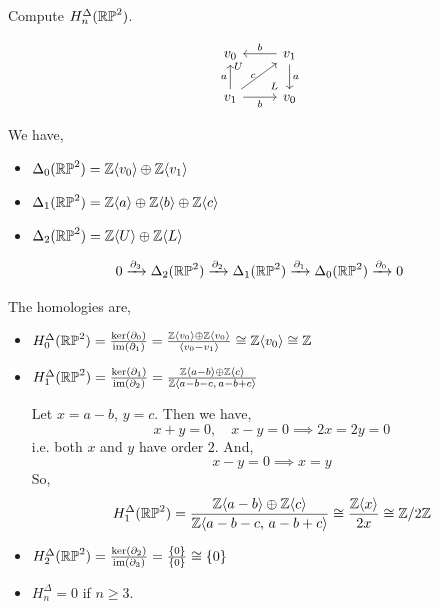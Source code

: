 \documentclass[12pt]{amsart}
\begin{document}
\begin{example}
    Compute $H^\Delta_n (\mathbb{RP}^2)$. 

    \[
    \begin{tikzcd}
    v_0   & v_1  \arrow[d,"a"] \arrow[l,"b", swap]\\
    v_1 \arrow[u,"a"] \arrow[r,swap,"b"] \arrow[ur,"c"{yshift = -.05in}] \arrow[ur, phantom, "\scriptstyle U"{yshift=0.1in, xshift=-.2in}] & v_0  \arrow[ul, phantom, "\scriptstyle L", very near start]
    \end{tikzcd}
    \]
    

    We have, 
    \begin{itemize}
        \item $\Delta_0(\mathbb{RP}^2) = \mathbb Z \langle v_0 \rangle \oplus \mathbb Z \langle v_1 \rangle$ 
        \item $\Delta_1(\mathbb{RP}^2) = \mathbb Z \langle a \rangle \oplus \mathbb Z \langle b \rangle \oplus \mathbb Z \langle c \rangle $ 
        \item $\Delta_2(\mathbb{RP}^2) = \mathbb Z \langle U \rangle \oplus \mathbb Z \langle L \rangle$ 

    \end{itemize}

    \[0 \xrightarrow{\partial_3} \Delta_2(\mathbb{RP}^2) \xrightarrow{\partial_2} \Delta_1(\mathbb{RP}^2) \xrightarrow{\partial_1} \Delta_0 (\mathbb{RP}^2) \xrightarrow{\partial_0} 0\]

    The homologies are, 
     \begin{itemize}
        \item $H_0^\Delta(\mathbb{RP}^2) = \frac{\ker(\partial_0)}{\operatorname{im}(\partial_1)} =  \frac{\mathbb Z\langle v_0 \rangle \oplus \mathbb Z\langle v_0 \rangle}{\langle v_0 - v_1\rangle} \cong \mathbb Z\langle v_0 \rangle \cong \mathbb Z$
        
        \item $H_1^\Delta(\mathbb{RP}^2) = \frac{\ker(\partial_1)}{\operatorname{im}(\partial_2)} =  \frac{\mathbb Z\langle a -b  \rangle \oplus \mathbb Z \langle c \rangle}{ \mathbb Z\langle a - b - c, \, a - b + c \rangle}$
        
        Let $x = a - b$, $y = c$. Then we have, 
        \[x + y = 0, \quad x - y = 0 \implies 2x = 2 y = 0\] 
        i.e. both $x$ and $y$ have order $2$. And, 
        \[x - y = 0 \implies x = y\]
        So,  
        \[H_1^\Delta(\mathbb{RP}^2) = \frac{\mathbb Z\langle a -b  \rangle \oplus \mathbb Z \langle c \rangle}{ \mathbb Z\langle a - b - c, \, a - b + c \rangle} \cong \frac{\mathbb Z\langle x \rangle }{2x} \cong \mathbb Z/2\mathbb Z\]

        
        \item $H^\Delta_2(\mathbb{RP}^2) = \frac{\ker(\partial_2)}{\operatorname{im}(\partial_3)} = \frac{\{0\}}{\{0\}} \cong \{0\} $

        \item $H_n^\Delta = 0$ if $n \geq 3$. 
    \end{itemize}
\end{example}
\end{document}
